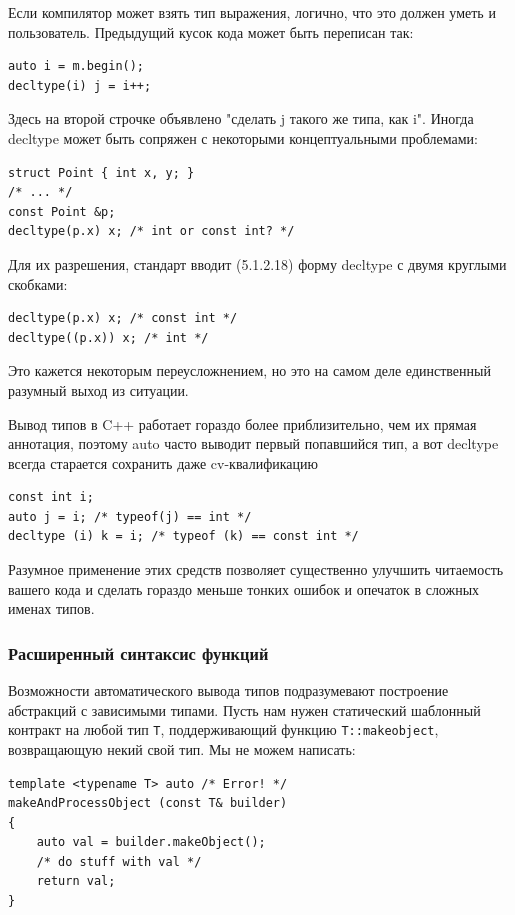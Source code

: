 \documentclass[a4paper,12pt,oneside]{article}
\begin{document}
Если компилятор может взять тип выражения, логично, что это должен уметь и пользователь. Предыдущий кусок кода может быть переписан так:

\begin{lstlisting}
auto i = m.begin(); 
decltype(i) j = i++;
\end{lstlisting}

Здесь на второй строчке объявлено "сделать j такого же типа, как i". Иногда decltype может быть сопряжен с некоторыми концептуальными проблемами:

\begin{lstlisting}
struct Point { int x, y; }
/* ... */
const Point &p;
decltype(p.x) x; /* int or const int? */
\end{lstlisting}

Для их разрешения, стандарт вводит (5.1.2.18) форму decltype с двумя круглыми скобками:

\begin{lstlisting}
decltype(p.x) x; /* const int */
decltype((p.x)) x; /* int */
\end{lstlisting}

Это кажется некоторым переусложнением, но это на самом деле единственный разумный выход из ситуации.

Вывод типов в C++ работает гораздо более приблизительно, чем их прямая аннотация, поэтому auto часто выводит первый попавшийся тип, а вот decltype всегда старается сохранить даже cv-квалификацию

\begin{lstlisting}
const int i;
auto j = i; /* typeof(j) == int */
decltype (i) k = i; /* typeof (k) == const int */
\end{lstlisting}

Разумное применение этих средств позволяет существенно улучшить читаемость вашего кода и сделать гораздо меньше тонких ошибок и опечаток в сложных именах типов.

\subsubsection{Расширенный синтаксис функций}

Возможности автоматического вывода типов подразумевают построение абстракций с зависимыми типами. Пусть нам нужен статический шаблонный контракт на любой тип \lstinline!T!, поддерживающий функцию \lstinline!T::makeobject!, возвращающую некий свой тип. Мы не можем написать:

\begin{lstlisting}
template <typename T> auto /* Error! */
makeAndProcessObject (const T& builder)
{
    auto val = builder.makeObject();
    /* do stuff with val */
    return val;
}
\end{lstlisting}
\end{document}
